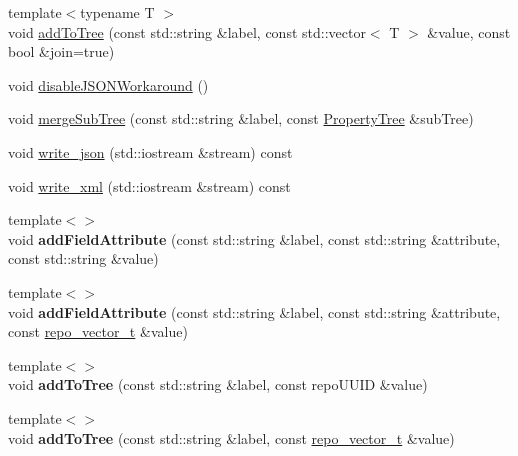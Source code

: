\begin{DoxyCompactItemize}
\item 
{\footnotesize template$<$typename T $>$ }\\void \hyperlink{classrepo_1_1lib_1_1_property_tree_aff24090893254b6bacb4a87a3dc463b1}{add\+To\+Tree} (const std\+::string \&label, const std\+::vector$<$ T $>$ \&value, const bool \&join=true)
\item 
void \hyperlink{classrepo_1_1lib_1_1_property_tree_ac830c1a733589cb5add54a7894dc9417}{disable\+J\+S\+O\+N\+Workaround} ()
\item 
void \hyperlink{classrepo_1_1lib_1_1_property_tree_ace335b74ffb3d113d44cdc92ebd83121}{merge\+Sub\+Tree} (const std\+::string \&label, const \hyperlink{classrepo_1_1lib_1_1_property_tree}{Property\+Tree} \&sub\+Tree)
\item 
void \hyperlink{classrepo_1_1lib_1_1_property_tree_a7839bcc54f771858ef1d046cea234cce}{write\+\_\+json} (std\+::iostream \&stream) const 
\item 
void \hyperlink{classrepo_1_1lib_1_1_property_tree_a22397eaf6fe50716a5a99c64dbde2294}{write\+\_\+xml} (std\+::iostream \&stream) const 
\item 
\hypertarget{classrepo_1_1lib_1_1_property_tree_a5bc49d8b8e5f5cac2e6cf921cd1c2874}{}{\footnotesize template$<$$>$ }\\void {\bfseries add\+Field\+Attribute} (const std\+::string \&label, const std\+::string \&attribute, const std\+::string \&value)\label{classrepo_1_1lib_1_1_property_tree_a5bc49d8b8e5f5cac2e6cf921cd1c2874}

\item 
\hypertarget{classrepo_1_1lib_1_1_property_tree_af3e02bc7144d85e6e39e2d2f1cfe8eb1}{}{\footnotesize template$<$$>$ }\\void {\bfseries add\+Field\+Attribute} (const std\+::string \&label, const std\+::string \&attribute, const \hyperlink{structrepo__vector__t}{repo\+\_\+vector\+\_\+t} \&value)\label{classrepo_1_1lib_1_1_property_tree_af3e02bc7144d85e6e39e2d2f1cfe8eb1}

\item 
\hypertarget{classrepo_1_1lib_1_1_property_tree_a48c7654533f0ae36866ea4b373760396}{}{\footnotesize template$<$$>$ }\\void {\bfseries add\+To\+Tree} (const std\+::string \&label, const repo\+U\+U\+I\+D \&value)\label{classrepo_1_1lib_1_1_property_tree_a48c7654533f0ae36866ea4b373760396}

\item 
\hypertarget{classrepo_1_1lib_1_1_property_tree_aae4dc92fcc99e294066995f2f2499de2}{}{\footnotesize template$<$$>$ }\\void {\bfseries add\+To\+Tree} (const std\+::string \&label, const \hyperlink{structrepo__vector__t}{repo\+\_\+vector\+\_\+t} \&value)\label{classrepo_1_1lib_1_1_property_tree_aae4dc92fcc99e294066995f2f2499de2}


\end{DoxyCompactItemize}
